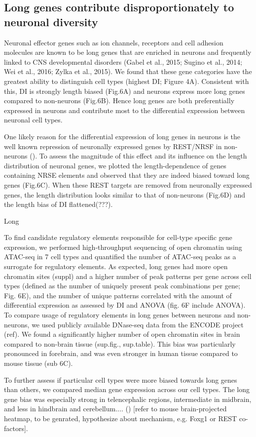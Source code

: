 \subsection{Long genes contribute disproportionately to neuronal diversity}

Neuronal effector genes such as ion channels, receptors and cell adhesion molecules are known to be long genes that are enriched in neurons and frequently linked to CNS developmental disorders (Gabel et al., 2015; Sugino et al., 2014; Wei et al., 2016; Zylka et al., 2015). We found that these gene categories have the greatest ability to distinguish cell types (highest DI; Figure 4A). Consistent with this, DI is strongly length biased (Fig.6A) and neurons express more long genes compared to non-neurons (Fig.6B). Hence long genes are both preferentially expressed in neurons and contribute most to the differential expression between neuronal cell types. 

One likely reason for the differential expression of long genes in neurons is the well known repression of neuronally expressed genes by REST/NRSF in non-neurons (). To assess the magnitude of this effect and its influence on the length distribution of neuronal genes, we plotted the length-dependence of genes containing NRSE elements and observed that they are indeed biased toward long genes (Fig.6C). When these REST targets are removed from neuronally expressed genes, the length distribution looks similar to that of non-neurons (Fig.6D) and the length bias of DI flattened(???).

Long

To find candidate regulatory elements responsible for cell-type specific gene expression, we performed high-throughput sequencing of open chromatin using ATAC-seq in 7 cell types and quantified the number of ATAC-seq peaks as a surrogate for regulatory elements. As expected, long genes had more open chromatin sites (suppl) and a higher number of peak patterns per gene across cell types (defined as the number of uniquely present peak combinations per gene;  Fig. 6E), and the number of unique patterns correlated with the amount of differential expression as assessed by DI and ANOVA (fig. 6F include ANOVA).
To compare usage of regulatory elements in long genes between neurons and non-neurons, we used publicly available DNase-seq data from the ENCODE project (ref). We found a significantly higher number of open chromatin sites in brain compared to non-brain tissue (sup.fig., sup.table). This bias was  particularly pronounced in forebrain, and was even stronger in human tissue compared to mouse tissue (sub 6C).

To further assess if particular cell types were more biased towards long genes than others, we compared median gene expression across our cell types. The long gene bias was especially strong in telencephalic regions, intermediate in midbrain, and less in hindbrain and cerebellum.... () [refer to mouse brain-projected heatmap, to be genrated, hypothesize about mechanism, e.g. Foxg1 or REST co-factors].